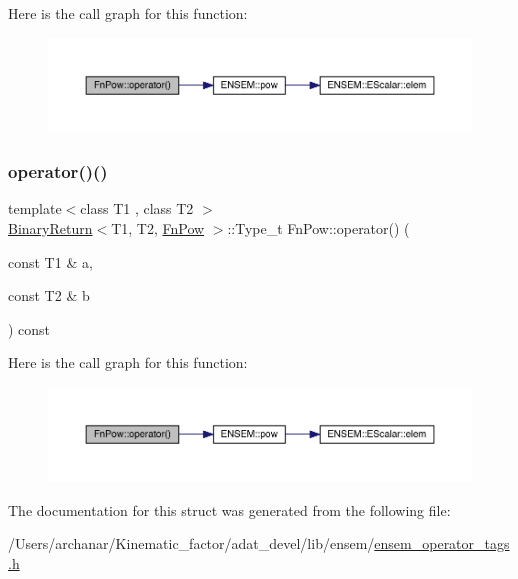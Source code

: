 Here is the call graph for this function\+:
\nopagebreak
\begin{figure}[H]
\begin{center}
\leavevmode
\includegraphics[width=350pt]{db/dec/structFnPow_ae45f2e7b97a332060329770959c524c7_cgraph}
\end{center}
\end{figure}
\mbox{\label{structFnPow_ae45f2e7b97a332060329770959c524c7}} 
\subsubsection{\texorpdfstring{operator()()}{operator()()}\hspace{0.1cm}{\footnotesize\ttfamily [2/2]}}
{\footnotesize\ttfamily template$<$class T1 , class T2 $>$ \\
\mbox{\hyperlink{structBinaryReturn}{Binary\+Return}}$<$T1, T2, \mbox{\hyperlink{structFnPow}{Fn\+Pow}} $>$\+::Type\+\_\+t Fn\+Pow\+::operator() (\begin{DoxyParamCaption}\item[{const T1 \&}]{a,  }\item[{const T2 \&}]{b }\end{DoxyParamCaption}) const\hspace{0.3cm}{\ttfamily [inline]}}

Here is the call graph for this function\+:
\nopagebreak
\begin{figure}[H]
\begin{center}
\leavevmode
\includegraphics[width=350pt]{db/dec/structFnPow_ae45f2e7b97a332060329770959c524c7_cgraph}
\end{center}
\end{figure}


The documentation for this struct was generated from the following file\+:\begin{DoxyCompactItemize}
\item 
/\+Users/archanar/\+Kinematic\+\_\+factor/adat\+\_\+devel/lib/ensem/\mbox{\hyperlink{lib_2ensem_2ensem__operator__tags_8h}{ensem\+\_\+operator\+\_\+tags.\+h}}\end{DoxyCompactItemize}
